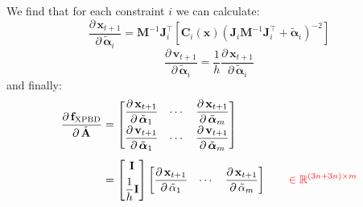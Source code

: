 \documentclass{article}
\newcommand{\pd}[2]{\dfrac{\partial\, #1}{\partial\, #2}}
\newcommand{\red}[1]{\textcolor{red}{#1}}
\begin{document}
\noindent We find that for each constraint $i$ we can calculate:
\begin{equation}
    \pd{\mathbf{x}_{t+1}}{\tilde{\boldsymbol{\alpha}}_i} = 
    \mathbf{M}^{-1}\mathbf{J}_i^\top \left[ \mathbf{C}_i(\mathbf{x})(\mathbf{J}_i\mathbf{M}^{-1}\mathbf{J}_i^\top + \tilde{\boldsymbol{\alpha}}_i)^{-2} \right]
\end{equation}
\begin{equation}
    \pd{\mathbf{v}_{t+1}}{\tilde{\boldsymbol{\alpha}}_i} = \frac{1}{h}\pd{\mathbf{x}_{t+1}}{\tilde{\boldsymbol{\alpha}}_i}
\end{equation}
and finally:
\begin{equation}
\begin{aligned}
\pd{\mathbf{f}_{\text{XPBD}}}{\tilde{\mathbf{A}}} &= 
\begin{bmatrix}
\displaystyle \pd{\mathbf{x}_{t+1}}{\tilde{\boldsymbol{\alpha}}_1} & \cdots &
\displaystyle \pd{\mathbf{x}_{t+1}}{\tilde{\boldsymbol{\alpha}}_m} \\[6pt]
\displaystyle \pd{\mathbf{v}_{t+1}}{\tilde{\boldsymbol{\alpha}}_1} & \cdots &
\displaystyle \pd{\mathbf{v}_{t+1}}{\tilde{\boldsymbol{\alpha}}_m}
\end{bmatrix} \\[1.0ex]
&=
\begin{bmatrix} 
\displaystyle\mathbf{I} \\[4pt] 
\displaystyle\frac{1}{h}\mathbf{I} \end{bmatrix}
\begin{bmatrix}
\displaystyle \pd{\mathbf{x}_{t+1}}{\tilde{\alpha}_1} & 
\cdots &
\displaystyle\pd{\mathbf{x}_{t+1}}{\tilde{\alpha}_m}
\end{bmatrix}
\qquad \red{\in \mathbb{R}^{(3n+3n)\times m}}
\end{aligned}
\end{equation}
\end{document}
